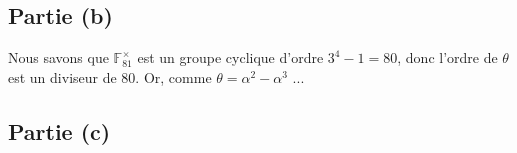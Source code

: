 \documentclass[12pt]{article}
\begin{document}
\subsection{Partie (b)}

Nous savons que $\mathbb{F}_{81}^\times$ est un groupe cyclique d'ordre $3^{4} - 1 = 80$, donc l'ordre de $\theta$ est un diviseur de 80. Or, comme $\theta = \alpha^2 - \alpha^3$ ...


\subsection{Partie (c)}






















\end{document}
